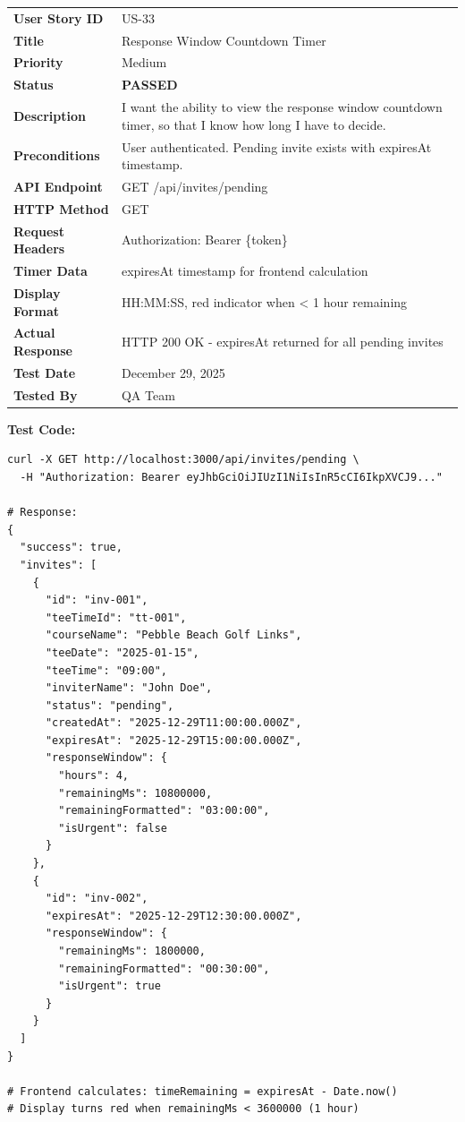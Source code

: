 \documentclass[11pt,a4paper]{article}
\newcommand{\passed}{\textcolor{pass}{\textbf{PASSED}}}
\begin{document}
\begin{tabularx}{\textwidth}{|p{3.2cm}|Y|}
\hline
{}
 \\
\hline
\textbf{User Story ID} & US-33 \\
\hline
\textbf{Title} & Response Window Countdown Timer \\
\hline
\textbf{Priority} & Medium \\
\hline
\textbf{Status} & \passed \\
\hline
\textbf{Description} & I want the ability to view the response window countdown timer, so that I know how long I have to decide. \\
\hline
\textbf{Preconditions} & User authenticated. Pending invite exists with expiresAt timestamp. \\
\hline
\textbf{API Endpoint} & GET /api/invites/pending \\
\hline
\textbf{HTTP Method} & GET \\
\hline
\textbf{Request Headers} & Authorization: Bearer \{token\} \\
\hline
\textbf{Timer Data} & expiresAt timestamp for frontend calculation \\
\hline
\textbf{Display Format} & HH:MM:SS, red indicator when < 1 hour remaining \\
\hline
\textbf{Actual Response} & HTTP 200 OK - expiresAt returned for all pending invites \\
\hline
\textbf{Test Date} & December 29, 2025 \\
\hline
\textbf{Tested By} & QA Team \\
\hline
\end{tabularx}

\vspace{0.3cm}
\textbf{Test Code:}
\begin{lstlisting}
curl -X GET http://localhost:3000/api/invites/pending \
  -H "Authorization: Bearer eyJhbGciOiJIUzI1NiIsInR5cCI6IkpXVCJ9..."

# Response:
{
  "success": true,
  "invites": [
    {
      "id": "inv-001",
      "teeTimeId": "tt-001",
      "courseName": "Pebble Beach Golf Links",
      "teeDate": "2025-01-15",
      "teeTime": "09:00",
      "inviterName": "John Doe",
      "status": "pending",
      "createdAt": "2025-12-29T11:00:00.000Z",
      "expiresAt": "2025-12-29T15:00:00.000Z",
      "responseWindow": {
        "hours": 4,
        "remainingMs": 10800000,
        "remainingFormatted": "03:00:00",
        "isUrgent": false
      }
    },
    {
      "id": "inv-002",
      "expiresAt": "2025-12-29T12:30:00.000Z",
      "responseWindow": {
        "remainingMs": 1800000,
        "remainingFormatted": "00:30:00",
        "isUrgent": true
      }
    }
  ]
}

# Frontend calculates: timeRemaining = expiresAt - Date.now()
# Display turns red when remainingMs < 3600000 (1 hour)
\end{lstlisting}
\end{document}
